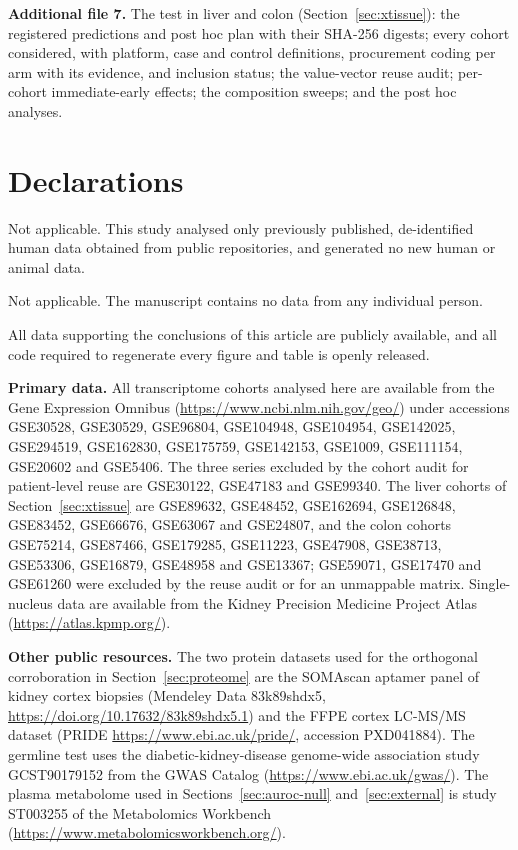 \documentclass[pdflatex,sn-vancouver-num]{sn-jnl}
\theoremstyle{thmstyleone}
\theoremstyle{thmstyletwo}
\theoremstyle{thmstylethree}
\begin{document}
\textbf{Additional file 7.} The test in liver and colon (Section~\ref{sec:xtissue}): the
registered predictions and post hoc plan with their SHA-256 digests; every cohort considered,
with platform, case and control definitions, procurement coding per arm with its evidence, and
inclusion status; the value-vector reuse audit; per-cohort immediate-early effects; the
composition sweeps; and the post hoc analyses.
\section*{Declarations}


Not applicable. This study analysed only previously published, de-identified human data obtained
from public repositories, and generated no new human or animal data.


Not applicable. The manuscript contains no data from any individual person.


All data supporting the conclusions of this article are publicly available, and all code
required to regenerate every figure and table is openly released.

\textbf{Primary data.} All transcriptome cohorts analysed here are available from the Gene
Expression Omnibus (\url{https://www.ncbi.nlm.nih.gov/geo/}) under accessions GSE30528,
GSE30529, GSE96804, GSE104948, GSE104954, GSE142025, GSE294519, GSE162830, GSE175759,
GSE142153, GSE1009, GSE111154, GSE20602 and GSE5406. The three series excluded by the cohort
audit for patient-level reuse are GSE30122, GSE47183 and GSE99340. The liver cohorts of
Section~\ref{sec:xtissue} are GSE89632, GSE48452, GSE162694, GSE126848, GSE83452, GSE66676,
GSE63067 and GSE24807, and the colon cohorts GSE75214, GSE87466, GSE179285, GSE11223, GSE47908,
GSE38713, GSE53306, GSE16879, GSE48958 and GSE13367; GSE59071, GSE17470 and GSE61260 were
excluded by the reuse audit or for an unmappable matrix. Single-nucleus data are
available from the Kidney Precision Medicine Project Atlas (\url{https://atlas.kpmp.org/}).

\textbf{Other public resources.} The two protein datasets used for the orthogonal corroboration in
Section~\ref{sec:proteome} are the SOMAscan aptamer panel of kidney cortex biopsies
(Mendeley Data 83k89shdx5, \url{https://doi.org/10.17632/83k89shdx5.1}) and the FFPE cortex
LC-MS/MS dataset (PRIDE \url{https://www.ebi.ac.uk/pride/}, accession PXD041884). The
germline test uses the diabetic-kidney-disease genome-wide association study GCST90179152
from the GWAS Catalog (\url{https://www.ebi.ac.uk/gwas/}). The plasma metabolome used in
Sections~\ref{sec:auroc-null} and~\ref{sec:external} is study ST003255 of the Metabolomics
Workbench (\url{https://www.metabolomicsworkbench.org/}).
\end{document}

